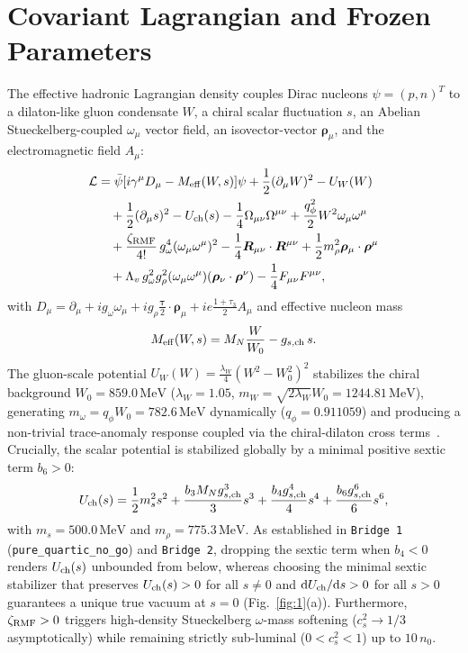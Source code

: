 \documentclass[aps,prc,twocolumn,superscriptaddress,nofootinbib,floatfix]{revtex4-2}
\begin{document}
\section{Covariant Lagrangian and Frozen Parameters}\label{sec:lagrangian}

The effective hadronic Lagrangian density couples Dirac nucleons $\psi = (p, n)^T$ to a dilaton-like gluon condensate $W$, a chiral scalar fluctuation $s$, an Abelian Stueckelberg-coupled $\omega_\mu$ vector field, an isovector-vector $\boldsymbol{\rho}_\mu$, and the electromagnetic field $A_\mu$:
\begin{align}
\mathcal{L} &= \bar{\psi}\!\left[i\gamma^\mu D_\mu - M_{\rm eff}(W,s)\right]\!\psi
+ \frac{1}{2}(\partial_\mu W)^2 - U_W(W) \nonumber\\
&\quad + \frac{1}{2}(\partial_\mu s)^2 - U_{\rm ch}(s)
- \frac{1}{4}\Omega_{\mu\nu}\Omega^{\mu\nu} + \frac{q_\phi^2}{2} W^2 \omega_\mu\omega^\mu \nonumber\\
&\quad + \frac{\zeta_{\rm RMF}}{4!}\, g_\omega^4 (\omega_\mu\omega^\mu)^2
- \frac{1}{4}\boldsymbol{R}_{\mu\nu}\cdot\boldsymbol{R}^{\mu\nu} + \frac{1}{2} m_\rho^2 \boldsymbol{\rho}_\mu\cdot\boldsymbol{\rho}^\mu \nonumber\\
&\quad + \Lambda_v\, g_\omega^2 g_\rho^2 (\omega_\mu\omega^\mu)(\boldsymbol{\rho}_\nu\cdot\boldsymbol{\rho}^\nu)
- \frac{1}{4} F_{\mu\nu}F^{\mu\nu},
\label{eq:lagrangian}
\end{align}
with $D_\mu = \partial_\mu + i g_\omega \omega_\mu + i g_\rho \frac{\boldsymbol{\tau}}{2}\cdot\boldsymbol{\rho}_\mu + i e \frac{1+\tau_3}{2} A_\mu$ and effective nucleon mass
\begin{equation}
M_{\rm eff}(W,s) = M_N \frac{W}{W_0} - g_{s,\mathrm{ch}}\, s.
\end{equation}
The gluon-scale potential $U_W(W) = \frac{\lambda_W}{4}(W^2 - W_0^2)^2$ stabilizes the chiral background $W_0 = 859.0\,\mathrm{MeV}$ ($\lambda_W = 1.05$, $m_W = \sqrt{2\lambda_W}W_0 = 1244.81\,\mathrm{MeV}$), generating $m_\omega = q_\phi W_0 = 782.6\,\mathrm{MeV}$ dynamically ($q_\phi = 0.911059$) and producing a non-trivial trace-anomaly response coupled via the chiral-dilaton cross terms~\cite{Kallosh,Bridge4}. Crucially, the scalar potential is stabilized globally by a minimal positive sextic term $b_6 > 0$:
\begin{equation}
U_{\rm ch}(s) = \frac{1}{2} m_s^2 s^2 + \frac{b_3 M_N g_{s,\mathrm{ch}}^3}{3} s^3 + \frac{b_4 g_{s,\mathrm{ch}}^4}{4} s^4 + \frac{b_6 g_{s,\mathrm{ch}}^6}{6} s^6,
\label{eq:Uch}
\end{equation}
with $m_s = 500.0\,\mathrm{MeV}$ and $m_\rho = 775.3\,\mathrm{MeV}$. As established in \texttt{Bridge 1} (\texttt{pure\_quartic\_no\_go}) and \texttt{Bridge 2}, dropping the sextic term when $b_4 < 0$ renders $U_{\rm ch}(s)$ unbounded from below, whereas choosing the minimal sextic stabilizer that preserves $U_{\rm ch}(s) > 0$ for all $s \neq 0$ and $\mathrm{d}U_{\rm ch}/\mathrm{d}s > 0$ for all $s > 0$ guarantees a unique true vacuum at $s = 0$ (Fig.~\ref{fig:1}(a)). Furthermore, $\zeta_{\rm RMF} > 0$ triggers high-density Stueckelberg $\omega$-mass softening ($c_s^2 \to 1/3$ asymptotically) while remaining strictly sub-luminal ($0 < c_s^2 < 1$) up to $10\,n_0$.
\end{document}
